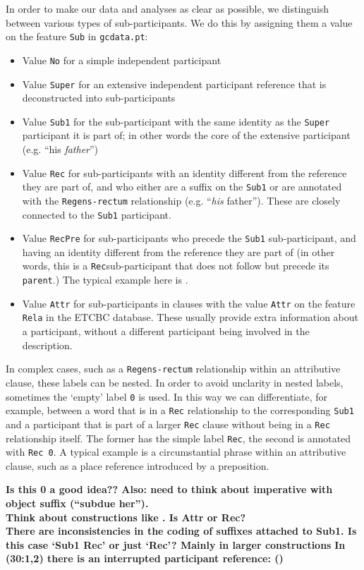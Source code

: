 \documentclass{report}
\newcommand{\mi}[1]{\lstinline{#1}}
\newcommand{\hebr}[1]{\cjRL{#1}}
\begin{document}
In order to make our data and analyses as clear as possible, we distinguish between various types of sub-participants. We do this by assigning them a value on the feature \mi{Sub} in \mi{gcdata.pt}:
\begin{itemize}
\item Value \mi{No} for a simple independent participant
\item Value \mi{Super} for an extensive independent participant reference that is deconstructed into sub-participants
\item Value \mi{Sub1} for the sub-participant with the same identity as the \mi{Super} participant it is part of; in other words the core of the extensive participant (e.g. ``his \emph{father}'')
\item Value \mi{Rec} for sub-participants with an identity different from the reference they are part of, and who either are a suffix on the \mi{Sub1} or are annotated with the \mi{Regens-rectum} relationship (e.g. ``\emph{his} father''). These are closely connected to the \mi{Sub1} participant.
\item Value \mi{RecPre} for sub-participants who precede the \mi{Sub1} sub-participant, and having an identity different from the reference they are part of (in other words, this is a \mi{Rec}sub-participant that does not follow but precede its \mi{parent}.) The typical example here is \hebr{KL}.
\item Value \mi{Attr} for sub-participants in clauses with the value \mi{Attr} on the feature \mi{Rela} in the ETCBC database. These usually provide extra information about a participant, without a different participant being involved in the description.
\end{itemize}

In complex cases, such as a \mi{Regens-rectum} relationship within an attributive clause, these labels can be nested.
In order to avoid unclarity in nested labels, sometimes the `empty' label \mi{0} is used. In this way we can differentiate, for example, between a word that is in a \mi{Rec} relationship to the corresponding \mi{Sub1} and a participant that is part of a larger \mi{Rec} clause without being in a \mi{Rec} relationship itself. The former has the simple label \mi{Rec}, the second is annotated with \mi{Rec 0}. A typical example is a circumstantial phrase within an attributive clause, such as a place reference introduced by a preposition.

\textbf{Is this 0 a good idea?? Also: need to think about imperative with object suffix (``subdue her'').} \\
\textbf{Think about constructions like \hebr{>RY KN<N}. Is \hebr{KN<N} Attr or Rec?} \\
\textbf{There are inconsistencies in the coding of suffixes attached to Sub1. Is this case `Sub1 Rec' or just `Rec'? Mainly in larger constructions}
\textbf{In (30:1,2) there is an interrupted participant reference: \hebr{TXT >LHJM} (\hebr{>NKJ}) \hebr{>CR MN< MMK PRJ BVN}}
\end{document}
